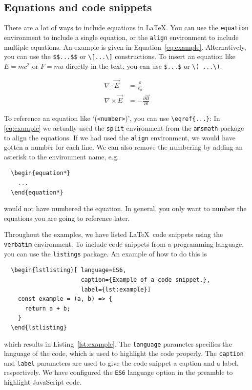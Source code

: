 \documentclass[a4paper,11pt]{article}
\begin{document}
\subsection{Equations and code snippets}

There are a lot of ways to include equations in \LaTeX. You can use the \verb|equation| environment to include a single equation, or the \verb|align| environment to include multiple equations. An example is given in Equation~\ref{eq:example}. Alternatively, you can use the \verb|$$...$$| or \verb|\[...\]| constructions. To insert an equation like $E=mc^2$ or \(F=ma\) directly in the text, you can use \verb|$...$| or \verb|\( ...\)|.

\begin{equation}
  \label{eq:example}
  \begin{split}
    \nabla \cdot \vec{E} &= \frac{\rho}{\varepsilon_0} \\
    \nabla \times \vec{E} &= -\frac{\partial \vec{B}}{\partial t}
  \end{split}
\end{equation}

To reference an equation like `(\texttt{<number>})', you can use \verb|\eqref{...}|: In \eqref{eq:example} we actually used the \verb|split| environment from the \texttt{amsmath} package to align the equations. If we had used the \verb|align| environment, we would have gotten a number for each line. We can also remove the numbering by adding an asterisk to the environment name, e.g.
\begin{verbatim}
  \begin{equation*}
    ...
  \end{equation*}
\end{verbatim}
would not have numbered the equation. In general, you only want to number the equations you are going to reference later.

Throughout the examples, we have listed \LaTeX~code snippets using the \verb|verbatim| environment. To include code snippets from a programming language, you can use the \texttt{listings} package. An example of how to do this is
\begin{verbatim}
  \begin{lstlisting}[ language=ES6, 
                      caption={Example of a code snippet.}, 
                      label={lst:example}]
    const example = (a, b) => {
      return a + b;
    }
  \end{lstlisting}
\end{verbatim}
which results in Listing~\ref{lst:example}. The \texttt{language} parameter specifies the language of the code, which is used to highlight the code properly. The \texttt{caption} and \texttt{label} parameters are used to give the code snippet a caption and a label, respectively. We have configured the \texttt{ES6} language option in the preamble to highlight JavaScript code.
\end{document}
